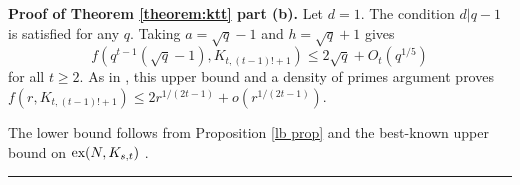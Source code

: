 \documentclass[12pt]{article}%
\newenvironment{proof}[1][Proof]{\noindent\textbf{#1.} }
{\hfill \ \rule{0.5em}{0.5em}}
\begin{document}

\bigskip
\noindent


\begin{proof}[Proof of Theorem \ref{theorem:ktt} part (b)]
Let $d = 1$.  The condition $d | q - 1$ is satisfied
for any $q$.  Taking $a =  \sqrt{q} - 1$ and $h =  \sqrt{q } + 1$ gives
\[
f( q^{t-1} ( \sqrt{q} - 1 ) , K_{t,(t-1)! +1} ) 
\leq 
2 \sqrt{q}  + O_t (q^{1/5} )
\]
for all $t \geq 2$.  As in \cite{AxeMartin}, this upper bound and a density of primes argument proves  
$f( r , K_{ t, (t - 1)! + 1} ) \leq 2 r^{1 / ( 2t - 1 )} +o(r^{1 / ( 2t - 1 )} ) $.  

The lower bound follows from Proposition \ref{lb prop} and the best-known upper bound on $\textup{ex}(N,K_{s,t})$ \cite{Furedi2, Nikiforov}.  
\end{proof}

\end{document}
